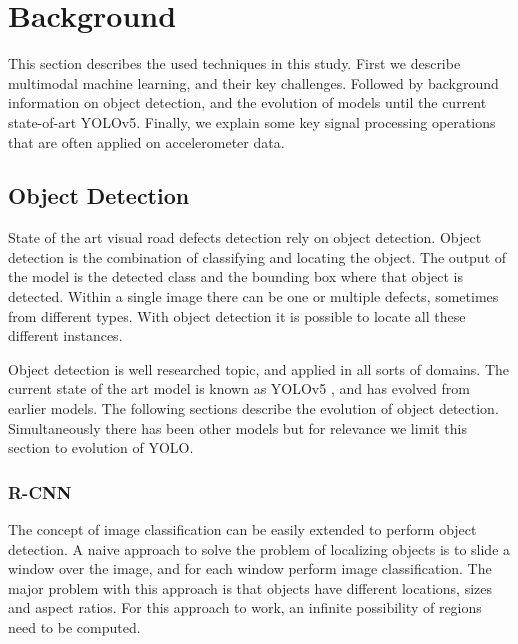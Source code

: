 \clearpage
\section{Background}
\label{sec:background}

This section describes the used techniques in this study. First we describe multimodal machine learning, and their key challenges. Followed by background information on object detection, and the evolution of models until the current state-of-art YOLOv5. Finally, we explain some key signal processing operations that are often applied on accelerometer data. 





\subsection{Object Detection}
\label{sec:object-detection}

State of the art visual road defects detection rely on object detection. Object detection is the combination of classifying and locating the object. The output of the model is the detected class and the bounding box where that object is detected. Within a single image there can be one or multiple defects, sometimes from different types. With object detection it is possible to locate all these different instances. 

Object detection is well researched topic, and applied in all sorts of domains. The current state of the art model is known as YOLOv5 \cite{Jocher2021}, and has evolved from earlier models. The following sections describe the evolution of object detection. Simultaneously there has been other models but for relevance we limit this section to evolution of YOLO.

\subsubsection{R-CNN}
The concept of image classification can be easily extended to perform object detection. A naive approach to solve the problem of localizing objects is to slide a window over the image, and for each window perform image classification. The major problem with this approach is that objects have different locations, sizes and aspect ratios. For this approach to work, an infinite possibility of regions need to be computed. 

